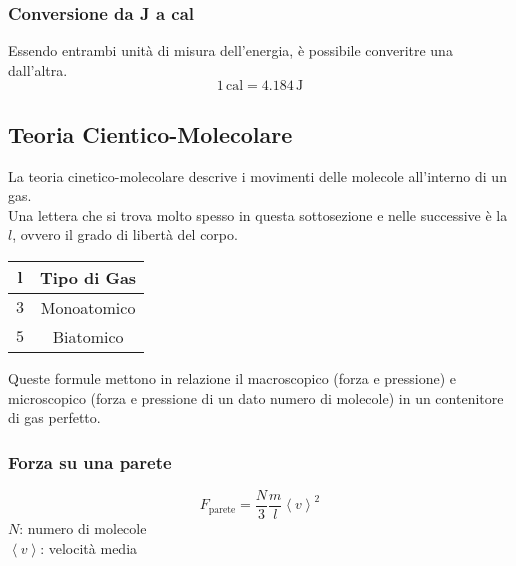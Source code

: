 \subsubsection{Conversione da J a cal}
Essendo entrambi unità di misura dell'energia, è possibile converitre una dall'altra.
\begin{equation*}
1\,\text{cal} = 4.184\,\text{J}
\end{equation*}

\subsection{Teoria Cientico-Molecolare}
La teoria cinetico-molecolare descrive i movimenti delle molecole all'interno di un gas.\\
Una lettera che si trova molto spesso in questa sottosezione e nelle successive è la $l$, ovvero
il grado di libertà del corpo.\\
\begin{center}
  \begin{tabular}{c c}
    $\boldsymbol{l}$ & \textbf{Tipo di Gas}\\ \hline
    $3$ & Monoatomico \\ \hline
    $5$ & Biatomico\\
  \end{tabular}
\end{center}
Queste formule mettono in relazione il macroscopico (forza e pressione) e microscopico (forza e 
pressione di un dato numero di molecole) in un contenitore di gas perfetto.

\begin{center}
\end{center}

\subsubsection{Forza su una parete}
\begin{equation*}
  F_{\text{parete}} = \frac{N}{3}\frac{m}{l}\left\langle v\right\rangle^2
\end{equation*}
$N$: numero di molecole\\
$\left\langle v\right\rangle$: velocità media

